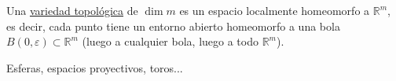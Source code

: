 \begin{defi}
Una \underline{variedad topológica} de $\dim m$ es un espacio localmente homeomorfo a $\mathbb{R}^m$, es decir, cada punto tiene un entorno abierto homeomorfo a una bola $B\left( 0, \varepsilon \right) \subset \mathbb{R}^m$ (luego a cualquier bola, luego a todo $\mathbb{R}^m$).
\end{defi}
\begin{ej}
Esferas, espacios proyectivos, toros...
\end{ej}

